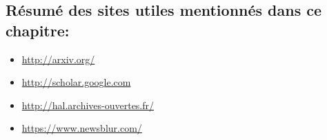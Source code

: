 \subsection*{R\'esum\'e des sites utiles mentionnés dans ce chapitre:}

\begin{itemize}
\item[\color{orange_js}{$\startri$}]
\url{http://arxiv.org/}
 \item[\color{orange_js}{$\startri$}]
\url{http://scholar.google.com} \item[\color{orange_js}{$\stardble$}]
\url{http://hal.archives-ouvertes.fr/}
  \item[\color{orange_js}{$\stardble$}]
\url{https://www.newsblur.com/}
\end{itemize}
